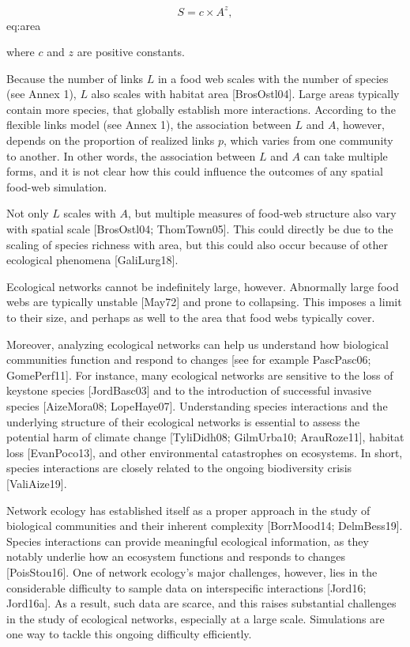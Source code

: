 $$ S = c \times A^z, $$ {eq:area}



where $c$ and $z$ are positive constants.

Because the number of links $L$ in a food web scales with the number of species
(see Annex 1), $L$ also scales with habitat area [BrosOstl04]. Large areas
typically contain more species, that globally establish more interactions.
According to the flexible links model (see Annex 1), the association between $L$
and $A$, however, depends on the proportion of realized links $p$, which varies
from one community to another. In other words, the association between $L$ and
$A$ can take multiple forms, and it is not clear how this could influence the
outcomes of any spatial food-web simulation.

Not only $L$ scales with $A$, but multiple measures of food-web structure also
vary with spatial scale [BrosOstl04; ThomTown05]. This could directly be due
to the scaling of species richness with area, but this could also occur because
of other ecological phenomena [GaliLurg18].

Ecological networks cannot be indefinitely large, however. Abnormally large food
webs are typically unstable [May72] and prone to collapsing. This
imposes a limit to their size, and perhaps as well to the area that food webs
typically cover.


Moreover, analyzing ecological networks can help us understand how biological
communities function and respond to changes [see for example PascPasc06;
GomePerf11]. For instance, many ecological networks are sensitive to the loss
of keystone species [JordBasc03] and to the introduction of successful invasive
species [AizeMora08; LopeHaye07]. Understanding species interactions and the
underlying structure of their ecological networks is essential to assess the
potential harm of climate change [TyliDidh08; GilmUrba10; ArauRoze11],
habitat loss [EvanPoco13], and other environmental catastrophes on ecosystems.
In short, species interactions are closely related to the ongoing biodiversity
crisis [ValiAize19].  

Network
ecology has established itself as a proper approach in the study of biological
communities and their inherent complexity [BorrMood14; DelmBess19]. Species
interactions can provide meaningful ecological information, as they notably
underlie how an ecosystem functions and responds to changes [PoisStou16]. One
of network ecology's major challenges, however, lies in the considerable
difficulty to sample data on interspecific interactions [Jord16; Jord16a]. As
a result, such data are scarce, and this raises substantial challenges in the
study of ecological networks, especially at a large scale. Simulations are one
way to tackle this ongoing difficulty efficiently.

